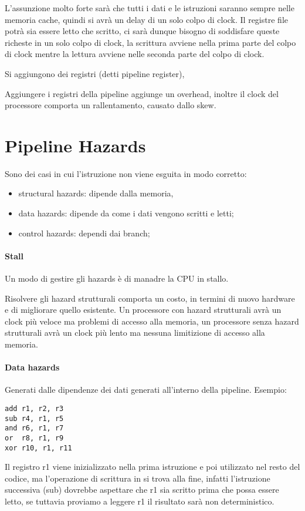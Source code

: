 \documentclass[12pt]{article}
\begin{document}
L'assunzione molto forte sar\`a che tutti i dati e le istruzioni saranno sempre nelle memoria cache, quindi si avr\`a un delay di un solo colpo di clock. Il registre file potr\`a sia essere letto che scritto, ci sar\`a dunque bisogno di soddisfare queste richeste in un solo colpo di clock, la scrittura avviene nella prima parte del colpo di clock mentre la lettura avviene nelle seconda parte del colpo di clock.

Si aggiungono dei registri (detti pipeline register), 

Aggiungere i registri della pipeline aggiunge un overhead, inoltre il clock del processore comporta un rallentamento, causato dallo skew.

\section{Pipeline Hazards}
Sono dei casi in cui l'istruzione non viene esguita in modo corretto:
\begin{itemize}
    \item structural hazards: dipende dalla memoria, 
    \item data hazards: dipende da come i dati vengono scritti e letti;
    \item control hazards: dependi dai branch;
\end{itemize}

\paragraph{Stall}
Un modo di gestire gli hazards \`e di manadre la CPU in stallo.

Risolvere gli hazard strutturali comporta un costo, in termini di nuovo hardware e di migliorare quello esistente. Un processore con hazard strutturali avr\`a un clock pi\`u veloce ma problemi di accesso alla memoria, un processore senza hazard strutturali avr\`a un clock pi\`u lento ma nessuna limitizione di accesso alla memoria.

\paragraph{Data hazards}
Generati dalle dipendenze dei dati generati all'interno della pipeline. Esempio:
\begin{lstlisting}
add r1, r2, r3
sub r4, r1, r5
and r6, r1, r7
or  r8, r1, r9
xor r10, r1, r11
\end{lstlisting}
Il registro r1 viene inizializzato nella prima istruzione e poi utilizzato nel resto del codice, ma l'operazione di scrittura in si trova alla fine, infatti l'istruzione successiva (sub) dovrebbe aspettare che r1 sia scritto prima che possa essere letto, se tuttavia proviamo a leggere r1 il risultato sar\`a non deterministico.
\end{document}
